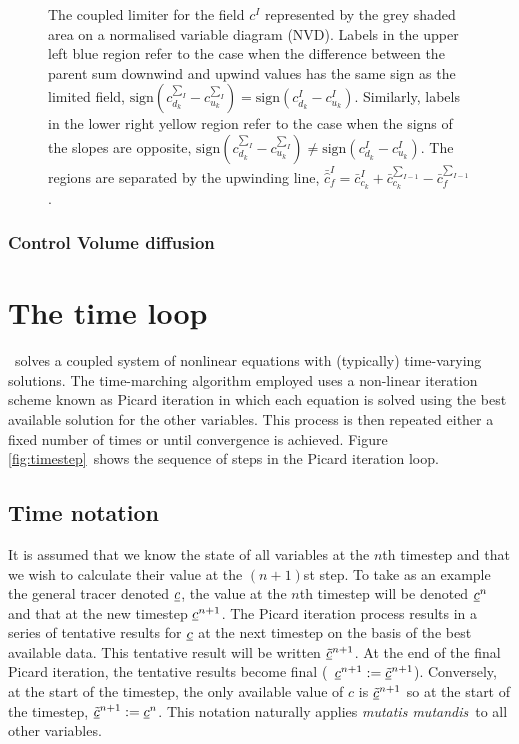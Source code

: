 \begin{figure}[tbp]
\begin{center}
\caption{The coupled limiter for the field $c^I$ represented by the grey shaded area on a normalised variable diagram (NVD).  Labels in the upper left blue region refer to the case when the difference between the parent sum downwind and upwind values has the same sign as the limited field, $\text{sign}\left(c^{\sum_{I}}_{d_k}-c^{\sum_{I}}_{u_k}\right) = \text{sign}\left(c^{I}_{d_k}-c^{I}_{u_k}\right)$.  Similarly, labels in the lower right yellow region refer to the case when the signs of the slopes are opposite, $\text{sign}\left(c^{\sum_{I}}_{d_k}-c^{\sum_{I}}_{u_k}\right) \neq \text{sign}\left(c^{I}_{d_k}-c^{I}_{u_k}\right)$. The regions are separated by the upwinding line, $\bar{\hat{c}}^{I}_{f} = \bar{c}^{I}_{c_k} + \bar{c}^{\sum_{I-1}}_{c_k} - \bar{c}^{\sum_{I-1}}_{f}$.}
\label{fig:coupledlimiter}
\end{center}
\end{figure}

\subsubsection{Control Volume diffusion}

\section{The time loop}
\label{sect:ND_time_loop}

\fluidity\ solves a coupled system of nonlinear equations with (typically)
time-varying solutions. The time-marching algorithm employed uses a
non-linear iteration scheme known as Picard iteration in which each equation
is solved using the best available solution for the other variables. This
process is then repeated either a fixed number of times or until convergence
is achieved. Figure \ref{fig:timestep}\ shows the sequence of steps in the
Picard iteration loop.

\subsection{Time notation}

It is assumed that we know the state of all variables at the $n$th timestep
and that we wish to calculate their value at the $(n+1)$st step. To take as an
example the general tracer denoted $\underline{c}$, the value at the $n$th
timestep will be denoted $\underline{c}^{n}$ and that at the new timestep
$\underline{c}^{n+1}$. The Picard iteration process results in a series of
tentative results for $\underline{c}$ at the next timestep on the basis of the
best available data. This tentative result will be written $\underline{\tilde c}^{n+1}$. At the
end of the final Picard iteration, the tentative results become final (\ie\
$\underline{c}^{n+1}:=\underline{\tilde c}^{n+1}$). Conversely, at the start of the timestep, the only
available value of $c$ is $\underline{\tilde c}^{n+1}$ so at the start of the timestep,
$\underline{\tilde c}^{n+1}:=\underline{c}^{n}$. This notation naturally applies \emph{mutatis mutandis}\ to
all other variables.

